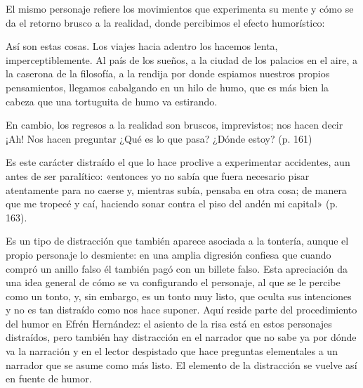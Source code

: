 \documentclass[14pt,twoside,final]{extbook} %
\begin{document}
El mismo personaje refiere los movimientos que experimenta su mente y cómo se da el retorno brusco a la realidad, donde percibimos el efecto humorístico:
\begin{quoting}
Así son estas cosas. Los viajes hacia adentro los hacemos lenta, imperceptiblemente. Al país de los sueños, a la ciudad de los palacios en el aire, a la caserona de la filosofía, a la rendija por donde espiamos nuestros propios pensamientos, llegamos cabalgando en un hilo de humo, que es más bien la cabeza que una tortuguita de humo va estirando.

En cambio, los regresos a la realidad son bruscos, imprevistos; nos hacen decir ¡Ah! Nos hacen preguntar ¿Qué es lo que pasa? ¿Dónde estoy? (p. 161)
\end{quoting}
Es este carácter distraído el que lo hace proclive a experimentar accidentes, aun antes de ser paralítico: «entonces yo no sabía que fuera necesario pisar atentamente para no caerse y, mientras subía, pensaba en otra cosa; de manera que me tropecé y caí, haciendo sonar contra el piso del andén mi capital» (p. 163).

Es un tipo de distracción que también aparece asociada a la tontería, aunque el propio personaje lo desmiente: en una amplia digresión confiesa que cuando compró un anillo falso él también pagó con un billete falso. Esta apreciación da una idea general de cómo se va configurando el personaje, al que se le percibe como un tonto, y, sin embargo, es un tonto muy listo, que oculta sus intenciones y no es tan distraído como nos hace suponer. Aquí reside parte del procedimiento del humor en Efrén Hernández: el asiento de la risa está en estos personajes distraídos, pero también hay distracción en el narrador que no sabe ya por dónde va la narración y en el lector despistado que hace preguntas elementales a un narrador que se asume como más listo. El elemento de la distracción se vuelve así en fuente de humor.
\end{document}
